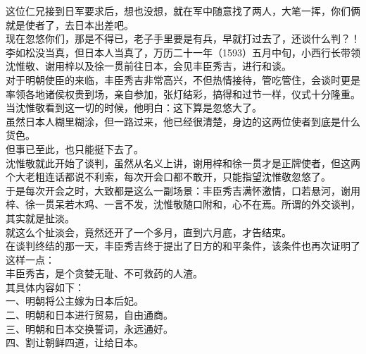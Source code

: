 \begin{multicols}{\theparacolNo}
这位仁兄接到日军要求后，想也没想，就在军中随意找了两人，大笔一挥，你们俩就是使者了，去日本出差吧。\\

现在忽悠你们，那是不得已，老子手里要是有兵，早就打过去了，还谈什么判？！\\

李如松没当真，但日本人当真了，万历二十一年（1593）五月中旬，小西行长带领沈惟敬、谢用梓以及徐一贯前往日本，会见丰臣秀吉，进行和谈。\\

对于明朝使臣的来临，丰臣秀吉非常高兴，不但热情接待，管吃管住，会谈时更是率领各地诸侯权贵到场，亲自参加，张灯结彩，搞得和过节一样，仪式十分隆重。\\

当沈惟敬看到这一切的时候，他明白：这下算是忽悠大了。\\

虽然日本人糊里糊涂，但一路过来，他已经很清楚，身边的这两位使者到底是什么货色。\\

但事已至此，也只能挺下去了。\\

沈惟敬就此开始了谈判，虽然从名义上讲，谢用梓和徐一贯才是正牌使者，但这两个大老粗连话都说不利索，每次开会口都不敢开，只能指望沈惟敬忽悠了。\\

于是每次开会之时，大致都是这么一副场景：丰臣秀吉满怀激情，口若悬河，谢用梓、徐一贯呆若木鸡、一言不发，沈惟敬随口附和，心不在焉。所谓的外交谈判，其实就是扯淡。\\

就这么个扯淡会，竟然还开了一个多月，直到六月底，才告结束。\\

在谈判终结的那一天，丰臣秀吉终于提出了日方的和平条件，该条件也再次证明了这样一点：\\

丰臣秀吉，是个贪婪无耻、不可救药的人渣。\\

其具体内容如下：\\

一、明朝将公主嫁为日本后妃。\\

二、明朝和日本进行贸易，自由通商。\\

三、明朝和日本交换誓词，永远通好。\\

四、割让朝鲜四道，让给日本。\\


\end{multicols}

